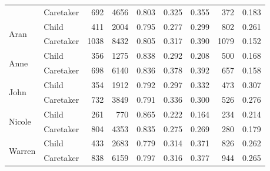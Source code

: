 \begin{table}[]
\begin{tabular}{llrrrrrrr}
                          & Caretaker & 692 & 4656 & 0.803 & 0.325 & 0.355 & 372 & 0.183 \\
\multirow{2}{*}{Aran} & Child & 411 & 2004 & 0.795 & 0.277 & 0.299 & 802 & 0.261 \\
                          & Caretaker & 1038 & 8432 & 0.805 & 0.317 & 0.390 & 1079 & 0.152 \\
\multirow{2}{*}{Anne} & Child & 356 & 1275 & 0.838 & 0.292 & 0.208 & 500 & 0.168 \\
                          & Caretaker & 698 & 6140 & 0.836 & 0.378 & 0.392 & 657 & 0.158 \\
\multirow{2}{*}{John} & Child & 354 & 1912 & 0.792 & 0.297 & 0.332 & 473 & 0.307 \\
                          & Caretaker & 732 & 3849 & 0.791 & 0.336 & 0.300 & 526 & 0.276 \\
\multirow{2}{*}{Nicole} & Child & 261 & 770 & 0.865 & 0.222 & 0.164 & 234 & 0.214 \\
                          & Caretaker & 804 & 4353 & 0.835 & 0.275 & 0.269 & 280 & 0.179 \\
\multirow{2}{*}{Warren} & Child & 433 & 2683 & 0.779 & 0.314 & 0.371 & 826 & 0.262 \\
                          & Caretaker & 838 & 6159 & 0.797 & 0.316 & 0.377 & 944 & 0.265 \\
\bottomrule
\end{tabular}
\end{table}